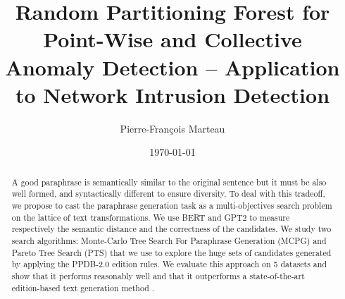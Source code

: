 \documentclass[a4paper]{article}
\title{Random Partitioning Forest for Point-Wise and Collective Anomaly Detection – Application to Network Intrusion Detection}
\author{Pierre-François Marteau}
\date{\today}
\begin{document}
\maketitle

\begin{abstract}
 A good paraphrase is semantically similar to the original sentence but it must be also well formed, and syntactically different to ensure diversity. To deal with this tradeoff, we propose to cast the paraphrase generation task as a multi-objectives search problem on the lattice of text transformations. We use BERT and GPT2 to measure respectively the semantic distance and the correctness of the candidates. We study two search algorithms: Monte-Carlo Tree Search For Paraphrase Generation (MCPG) and Pareto Tree Search (PTS) that we use to explore the huge sets of candidates generated by applying the PPDB-2.0 edition rules. We evaluate this approach on 5 datasets and show that it performs reasonably well and that it outperforms a state-of-the-art edition-based text generation method .
\end{abstract}
\end{document}
